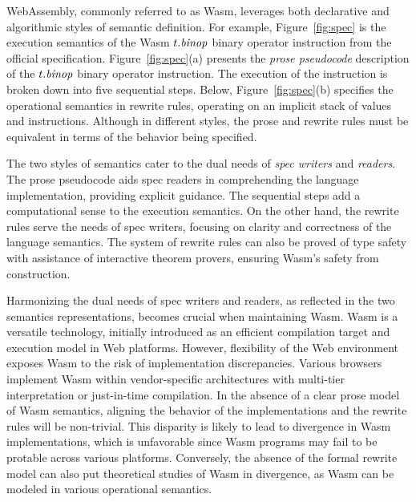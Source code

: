 WebAssembly, commonly referred to as Wasm, leverages both declarative and algorithmic styles of semantic definition. 
For example, Figure~\ref{fig:spec} is the execution semantics of the Wasm $t.\mbox{\emph{binop}}$ binary operator instruction from the official specification. 
Figure~\ref{fig:spec}(a) presents the \textit{prose pseudocode} description of the $t.\mbox{\emph{binop}}$ binary operator instruction. 
The execution of the instruction is broken down into five sequential steps. 
Below, Figure~\ref{fig:spec}(b) specifies the operational semantics in rewrite rules, operating on an implicit stack of values and instructions.  
Although in different styles, the prose and rewrite rules must be equivalent in terms of the behavior being specified.

The two styles of semantics cater to the dual needs of \textit{spec writers} and \textit{readers}. 
The prose pseudocode aids spec readers in comprehending the language implementation, providing explicit guidance. 
The sequential steps add a computational sense to the execution semantics. 
On the other hand, the rewrite rules serve the needs of spec writers, focusing on clarity and correctness of the language semantics. 
The system of rewrite rules can also be proved of type safety with assistance of interactive theorem provers, ensuring Wasm's safety from construction.

Harmonizing the dual needs of spec writers and readers, as reflected in the two semantics representations, becomes crucial when maintaining Wasm.
Wasm is a versatile technology, initially introduced as an efficient compilation target and execution model in Web platforms. 
However, flexibility of the Web environment exposes Wasm to the risk of implementation discrepancies.  
Various browsers implement Wasm within vendor-specific architectures with multi-tier interpretation or just-in-time compilation. 
In the absence of a clear prose model of Wasm semantics, aligning the behavior of the implementations and the rewrite rules will be non-trivial. 
This disparity is likely to lead to divergence in Wasm implementations, which is unfavorable since Wasm programs may fail to be protable across various platforms. 
Conversely, the absence of the formal rewrite model can also put theoretical studies of Wasm in divergence, as Wasm can be modeled in various operational semantics.  

